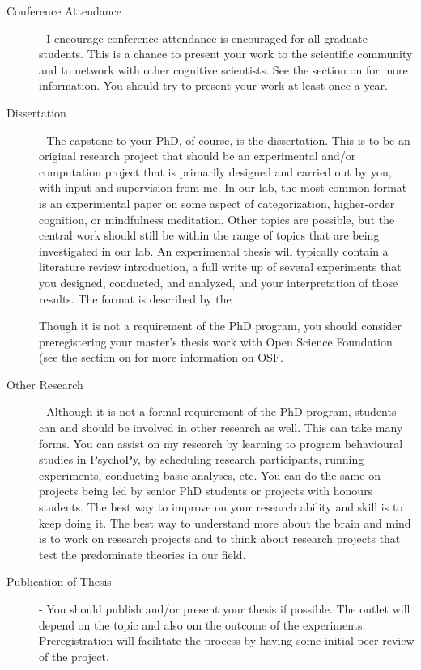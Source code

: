 \documentclass{article}
\begin{document}
\begin{description}
\item [Conference Attendance] - I encourage conference attendance is encouraged for all graduate students. This is a chance to present your work to the scientific community and to network with other cognitive scientists. See the section on  for more information. You should try to present your work at least once a year.

\item [Dissertation] - The capstone to your PhD, of course, is the dissertation. This is to be an original research project that should be an experimental and/or computation project that is primarily designed and carried out by you, with input and supervision from me. In our lab, the most common format is an experimental paper on some aspect of categorization, higher-order cognition, or mindfulness meditation. Other topics are possible, but the central work should still be within the range of topics that are being investigated in our lab. An experimental thesis will typically contain a literature review introduction, a full write up of several experiments that you designed, conducted, and analyzed, and your interpretation of those results. The format is described by the  

Though it is not a requirement of the PhD program, you should consider preregistering your master's thesis work with Open Science Foundation (see the section on  for more information on OSF.

\item [Other Research] - Although it is not a formal requirement of the PhD program, students can and should be involved in other research as well. This can take many forms. You can assist on my research by learning to program behavioural studies in PsychoPy, by scheduling research participants, running experiments, conducting basic analyses, etc. You can do the same on projects being led by senior PhD students or projects with honours students. The best way to improve on your research ability and skill is to keep doing it. The best way to understand more about the brain and mind is to work on research projects and to think about research projects that test the predominate theories in our field.

\item [Publication of Thesis] - You should publish and/or present your thesis if possible. The outlet will depend on the topic and also om the outcome of the experiments. Preregistration will facilitate the process by having some initial peer review of the project. 


\end{description}
\end{document}

